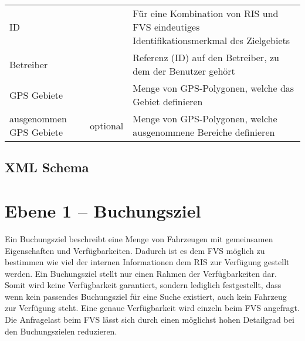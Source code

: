 \begin{flushleft}
\begin{tabularx}{\linewidth}{l>{\raggedright\arraybackslash}l>{\raggedright\arraybackslash}X} 
\toprule
ID & & Für eine Kombination von RIS und FVS eindeutiges Identifikationsmerkmal des Zielgebiets \\
Betreiber & & Referenz (ID) auf den Betreiber, zu dem der Benutzer gehört \\
GPS Gebiete & & Menge von GPS-Polygonen, welche das Gebiet definieren \\
ausgenommen GPS Gebiete & optional & Menge von GPS-Polygonen, welche ausgenommene Bereiche definieren \\
\bottomrule
\end{tabularx}
\end{flushleft}

\subsection{XML Schema}



\section{Ebene 1 -- Buchungsziel}
Ein Buchungsziel beschreibt eine Menge von Fahrzeugen mit gemeinsamen Eigenschaften und Verfügbarkeiten. Dadurch ist es dem FVS möglich zu bestimmen wie viel der internen Informationen dem RIS zur Verfügung gestellt werden. Ein Buchungsziel stellt nur einen Rahmen der Verfügbarkeiten dar. Somit wird keine Verfügbarkeit garantiert, sondern lediglich festgestellt, dass wenn kein passendes Buchungsziel für eine Suche existiert, auch kein Fahrzeug zur Verfügung steht. Eine genaue Verfügbarkeit wird einzeln beim FVS angefragt. Die Anfragelast beim FVS lässt sich durch einen möglichst hohen Detailgrad bei den Buchungszielen reduzieren.

